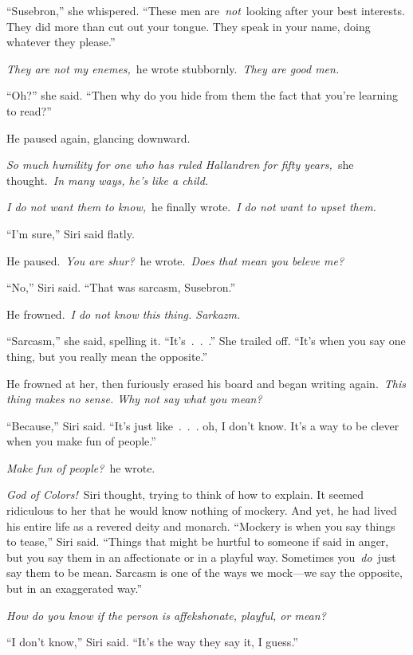 “Susebron,” she whispered. “These men are~\textit{not}~looking after your best interests. They did more than cut out your tongue. They speak in your name, doing whatever they please.”

\textit{They are not my enemes,}~he wrote stubbornly.~\textit{They are good men.}

“Oh?” she said. “Then why do you hide from them the fact that you’re learning to read?”

He paused again, glancing downward.

\textit{So much humility for one who has ruled Hallandren for fifty years,}~she thought.~\textit{In many ways, he’s like a child.}

\textit{I do not want them to know,}~he finally wrote.~\textit{I do not want to upset them.}

“I’m sure,” Siri said flatly.

He paused.~\textit{You are shur?}~he wrote.~\textit{Does that mean you beleve me?}

“No,” Siri said. “That was sarcasm, Susebron.”

He frowned.~\textit{I do not know this thing. Sarkazm.}

“Sarcasm,” she said, spelling it. “It’s~.~.~.” She trailed off. “It’s when you say one thing, but you really mean the opposite.”

He frowned at her, then furiously erased his board and began writing again.~\textit{This thing makes no sense. Why not say what you mean?}

“Because,” Siri said. “It’s just like~.~.~. oh, I don’t know. It’s a way to be clever when you make fun of people.”

\textit{Make fun of people?}~he wrote.

\textit{God of Colors!}~Siri thought, trying to think of how to explain. It seemed ridiculous to her that he would know nothing of mockery. And yet, he had lived his entire life as a revered deity and monarch. “Mockery is when you say things to tease,” Siri said. “Things that might be hurtful to someone if said in anger, but you say them in an affectionate or in a playful way. Sometimes you~\textit{do}~just say them to be mean. Sarcasm is one of the ways we mock—we say the opposite, but in an exaggerated way.”

\textit{How do you know if the person is affekshonate, playful, or mean?}

“I don’t know,” Siri said. “It’s the way they say it, I guess.”

